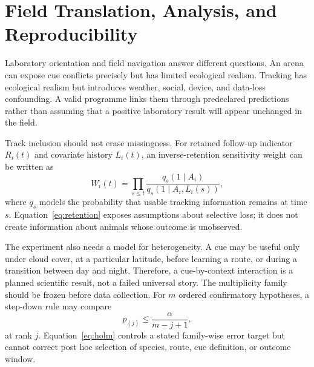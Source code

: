 \documentclass[conference]{IEEEtran}
\begin{document}
\section{Field Translation, Analysis, and Reproducibility}\label{sec:translation}
Laboratory orientation and field navigation answer different questions. An arena can expose cue conflicts precisely but has limited ecological realism. Tracking has ecological realism but introduces weather, social, device, and data-loss confounding. A valid programme links them through predeclared predictions rather than assuming that a positive laboratory result will appear unchanged in the field.

Track inclusion should not erase missingness. For retained follow-up indicator $R_i(t)$ and covariate history $L_i(t)$, an inverse-retention sensitivity weight can be written as
\begin{equation}
W_i(t)=\prod_{s\leq t}\frac{q_s(1\mid A_i)}{q_s(1\mid A_i,L_i(s))},
\label{eq:retention}
\end{equation}
where $q_s$ models the probability that usable tracking information remains at time $s$. Equation~\eqref{eq:retention} exposes assumptions about selective loss; it does not create information about animals whose outcome is unobserved.

The experiment also needs a model for heterogeneity. A cue may be useful only under cloud cover, at a particular latitude, before learning a route, or during a transition between day and night. Therefore, a cue-by-context interaction is a planned scientific result, not a failed universal story. The multiplicity family should be frozen before data collection. For $m$ ordered confirmatory hypotheses, a step-down rule may compare
\begin{equation}
p_{(j)}\leq\frac{\alpha}{m-j+1},
\label{eq:holm}
\end{equation}
at rank $j$. Equation~\eqref{eq:holm} controls a stated family-wise error target but cannot correct post hoc selection of species, route, cue definition, or outcome window.
\end{document}
